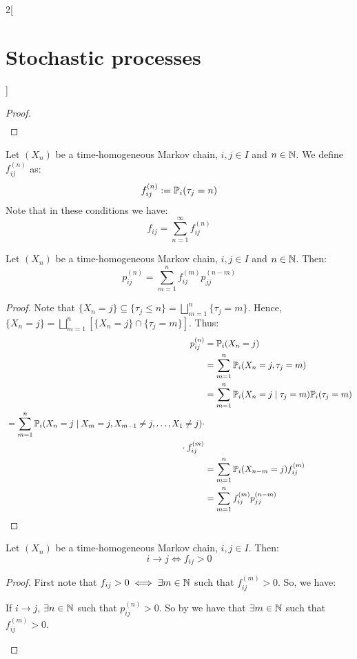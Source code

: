 \documentclass[../../../main_math.tex]{subfiles}
\begin{document}
\begin{multicols}{2}[\section{Stochastic processes}]
\begin{proof}
\begin{multline*}
    \end{multline*}
  \end{proof}
  \begin{definition}
    Let $(X_n)$ be a time-homogeneous Markov chain, $i, j\in I$ and $n\in\mathbb{N}$. We define $f_{ij}^{(n)}$ as:
    $$f_{ij}^{(n)}:=\mathbb{P}_i(\tau_j=n)$$
    Note that in these conditions we have:
    $$
      f_{ij}=\sum_{n=1}^{\infty}f_{ij}^{(n)}
    $$
  \end{definition}
  \begin{proposition}\label{SP:pij-fij}
    Let $(X_n)$ be a time-homogeneous Markov chain, $i, j\in I$ and $n\in\mathbb{N}$. Then:
    $$
      p_{ij}^{(n)}=\sum_{m=1}^{n} f_{ij}^{(m)}p_{jj}^{(n-m)}
    $$
  \end{proposition}
  \begin{proof}
    Note that $\{X_n=j\}\subseteq \{\tau_j\leq n\}=\bigsqcup_{m=1}^n\{\tau_j=m\}$. Hence, $\{X_n=j\}=\bigsqcup_{m=1}^n[\{X_n=j\}\cap \{\tau_j=m\}]$. Thus:
    \begin{align*}
      p_{ij}^{(n)} & =\Prob_i(X_n=j)                                              \\
                   & =\sum_{m=1}^n \Prob_i(X_n=j,\tau_j=m)                        \\
                   & =\sum_{m=1}^n \Prob_i(X_n=j\mid\tau_j=m)\Prob_i(\tau_j=m)    \\
      \begin{split}
        & =\sum_{m=1}^n \Prob_i(X_n=j\mid X_m=j,X_{m-1}\ne j,\ldots, X_1\ne j)\cdot \\
        &\hspace{7cm}\cdot f_{ij}^{(m)}
      \end{split} \\
                   & =\sum_{m=1}^n \Prob_i(X_{n-m}=j)f_{ij}^{(m)}                 \\
                   & =\sum_{m=1}^nf_{ij}^{(m)}p_{jj}^{(n-m)}
    \end{align*}
  \end{proof}
  \begin{proposition}
    Let $(X_n)$ be a time-homogeneous Markov chain, $i, j\in I$. Then:
    $$
      i\to j\iff f_{ij}>0
    $$
  \end{proposition}
  \begin{proof}
    First note that $f_{ij}>0\iff \exists m\in\mathbb{N}$ such that $f_{ij}^{(m)}>0$. So, we have:
    \begin{itemizeiff}
      If $i\to j$, $\exists n\in\mathbb{N}$ such that $p_{ij}^{(n)}>0$. So by  we have that $ \exists m\in\mathbb{N}$ such that $f_{ij}^{(m)}>0$.

\end{itemizeiff}
\end{proof}
\end{multicols}
\end{document}
